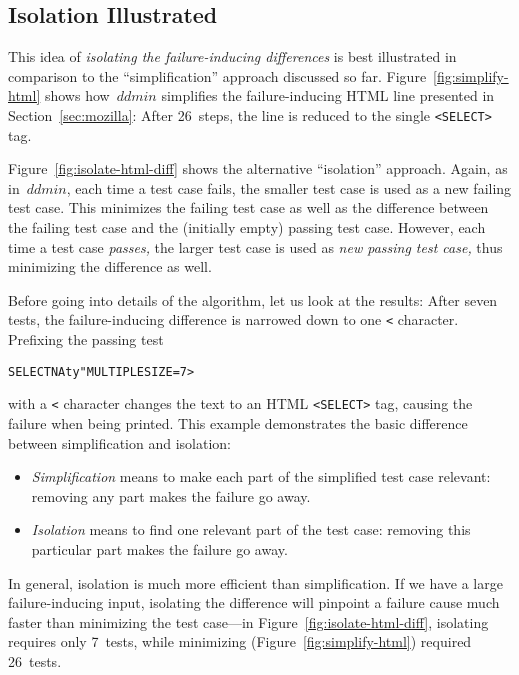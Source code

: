 \documentclass{acm_proc_article-sp}
\newcommand{\HTML}       {{\small HTML}\xspace}
\newcommand{\ddmin}{\textit{ddmin}\xspace}
\newcommand{\codeid}[1]{\text{\upshape\texttt{#1}}}
\def\<#1>{\codeid{#1}}
\newcommand{\s}{\char32}
\theoremstyle{plain}
\begin{document}
\subsection{Isolation Illustrated}
\label{sec:isolation-illustrated}

This idea of \emph{isolating the failure-inducing differences} is best
illustrated in comparison to the ``simplification'' approach discussed
so far.  Figure~\ref{fig:simplify-html} shows how~$\ddmin$ simplifies
the failure-inducing \HTML line presented in
Section~\ref{sec:mozilla}: After 26~steps, the line is reduced to the
single \texttt{<SELECT>} tag.

Figure~\ref{fig:isolate-html-diff} shows the alternative ``isolation''
approach.  Again, as in~$\ddmin$, each time a test case fails, the
smaller test case is used as a new failing test case.  This minimizes
the failing test case as well as the difference between the failing
test case and the (initially empty) passing test case.  However, each
time a test case \emph{passes,} the larger test case is used as
\emph{new passing test case,} thus minimizing the difference as well.

Before going into details of the algorithm, let us look at the
results: After seven tests, the failure-inducing difference is
narrowed down to one \texttt{<} character.  Prefixing the passing test
\begin{alltt}
    SELECT{\s}NAty"{\s}MULTIPLE{\s}SIZE=7>
\end{alltt}
with a \texttt{<} character changes the \<SELECT> text to an \HTML
\texttt{<SELECT>} tag, causing the failure when being printed.
This example demonstrates the basic difference between simplification and
isolation:
\begin{itemize}
\item \emph{Simplification} means to make each part of the simplified
  test case relevant: removing any part makes the failure go away.
\item \emph{Isolation} means to find one relevant part of the test
  case: removing this particular part makes the failure go away.
\end{itemize}

In general, isolation is much more efficient than simplification.  If
we have a large failure-inducing input, isolating the difference will
pinpoint a failure cause much faster than minimizing the test
case---in Figure~\ref{fig:isolate-html-diff}, isolating requires only
7~tests, while minimizing (Figure~\ref{fig:simplify-html}) required
26~tests.
\end{document}
